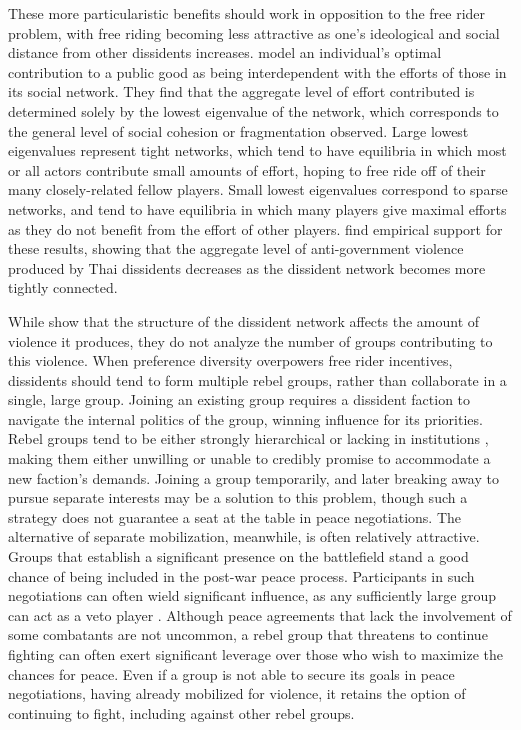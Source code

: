 These more particularistic benefits should work in opposition to the free rider problem, with free riding becoming less attractive as one's ideological and social distance from other dissidents increases. \citet{Bramoulle2014} model an individual's optimal contribution to a public good as being interdependent with the efforts of those in its social network. They find that the aggregate level of effort contributed is determined solely by the lowest eigenvalue of the network, which corresponds to the general level of social cohesion or fragmentation observed. Large lowest eigenvalues represent tight networks, which tend to have equilibria in which most or all actors contribute small amounts of effort, hoping to free ride off of their many closely-related fellow players. Small lowest eigenvalues correspond to sparse networks, and tend to have equilibria in which many players give maximal efforts as they do not benefit from the effort of other players. \citet{Metternich2013} find empirical support for these results, showing that the aggregate level of anti-government violence produced by Thai dissidents decreases as the dissident network becomes more tightly connected.

While \citet{Metternich2013} show that the structure of the dissident network affects the amount of violence it produces, they do not analyze the number of groups contributing to this violence. When preference diversity overpowers free rider incentives, dissidents should tend to form multiple rebel groups, rather than collaborate in a single, large group. Joining an existing group requires a dissident faction to navigate the internal politics of the group, winning influence for its priorities. Rebel groups tend to be either strongly hierarchical or lacking in institutions \citep{Staniland2014}, making them either unwilling or unable to credibly promise to accommodate a new faction's demands. Joining a group temporarily, and later breaking away to pursue separate interests may be a solution to this problem, though such a strategy does not guarantee a seat at the table in peace negotiations. The alternative of separate mobilization, meanwhile, is often relatively attractive. Groups that establish a significant presence on the battlefield stand a good chance of being included in the post-war peace process. Participants in such negotiations can often wield significant influence, as any sufficiently large group can act as a veto player \citep{Cunningham2006}. Although peace agreements that lack the involvement of some combatants are not uncommon, a rebel group that threatens to continue fighting can often exert significant leverage over those who wish to maximize the chances for peace. Even if a group is not able to secure its goals in peace negotiations, having already mobilized for violence, it retains the option of continuing to fight, including against other rebel groups.

